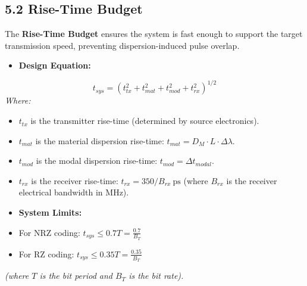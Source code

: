 \subsection{5.2 Rise-Time Budget}
The \textbf{Rise-Time Budget} ensures the system is fast enough to support the target transmission speed, preventing dispersion-induced pulse overlap.
\begin{itemize}
  \item   \textbf{Design Equation:}
\end{itemize}
    \[ t_{sys} = \left( t_{tx}^2 + t_{mat}^2 + t_{mod}^2 + t_{rx}^2 \right)^{1/2} \]
    \textit{Where:}
\begin{itemize}
  \item   $t_{tx}$ is the transmitter rise-time (determined by source electronics).
  \item   $t_{mat}$ is the material dispersion rise-time: $t_{mat} = D_M \cdot L \cdot \Delta\lambda$.
  \item   $t_{mod}$ is the modal dispersion rise-time: $t_{mod} = \Delta t_{modal}$.
  \item   $t_{rx}$ is the receiver rise-time: $t_{rx} = 350 / B_{rx}\ \text{ps}$ (where $B_{rx}$ is the receiver electrical bandwidth in MHz).
  \item   \textbf{System Limits:}
  \item   For NRZ coding: $t_{sys} \le 0.7 T = \frac{0.7}{B_T}$
  \item   For RZ coding: $t_{sys} \le 0.35 T = \frac{0.35}{B_T}$
\end{itemize}
    \textit{(where $T$ is the bit period and $B_T$ is the bit rate).}



